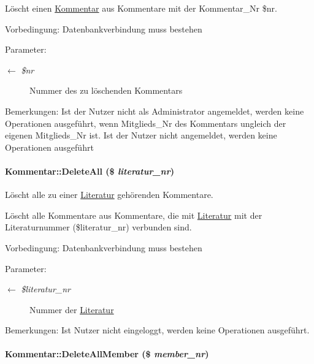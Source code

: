 Löscht einen \hyperlink{classKommentar}{Kommentar} aus Kommentare mit der Kommentar\_\-Nr \$nr. \begin{Desc}
\item[Vorbedingung:]Datenbankverbindung muss bestehen \end{Desc}
\begin{Desc}
\item[Parameter:]
\begin{description}
\item[\mbox{$\leftarrow$} {\em \$nr}]Nummer des zu löschenden Kommentars \end{description}
\end{Desc}
\begin{Desc}
\item[Bemerkungen:]Ist der Nutzer nicht als Administrator angemeldet, werden keine Operationen ausgeführt, wenn Mitglieds\_\-Nr des Kommentars ungleich der eigenen Mitglieds\_\-Nr ist. Ist der Nutzer nicht angemeldet, werden keine Operationen ausgeführt \end{Desc}
\hypertarget{classKommentar_9903f1df98f71eefa3b44a81d6a8ee5c}{
\paragraph[DeleteAll]{\setlength{\rightskip}{0pt plus 5cm}Kommentar::Delete\-All (\$ {\em literatur\_\-nr})}\hfill}
\label{classKommentar_9903f1df98f71eefa3b44a81d6a8ee5c}


Löscht alle zu einer \hyperlink{classLiteratur}{Literatur} gehörenden Kommentare. 

Löscht alle Kommentare aus Kommentare, die mit \hyperlink{classLiteratur}{Literatur} mit der Literaturnummer (\$literatur\_\-nr) verbunden sind. \begin{Desc}
\item[Vorbedingung:]Datenbankverbindung muss bestehen \end{Desc}
\begin{Desc}
\item[Parameter:]
\begin{description}
\item[\mbox{$\leftarrow$} {\em \$literatur\_\-nr}]Nummer der \hyperlink{classLiteratur}{Literatur} \end{description}
\end{Desc}
\begin{Desc}
\item[Bemerkungen:]Ist Nutzer nicht eingeloggt, werden keine Operationen ausgeführt. \end{Desc}
\hypertarget{classKommentar_92a8fcea1b065341c7c53e8a8464fcf0}{
\paragraph[DeleteAllMember]{\setlength{\rightskip}{0pt plus 5cm}Kommentar::Delete\-All\-Member (\$ {\em member\_\-nr})}\hfill}
\label{classKommentar_92a8fcea1b065341c7c53e8a8464fcf0}


